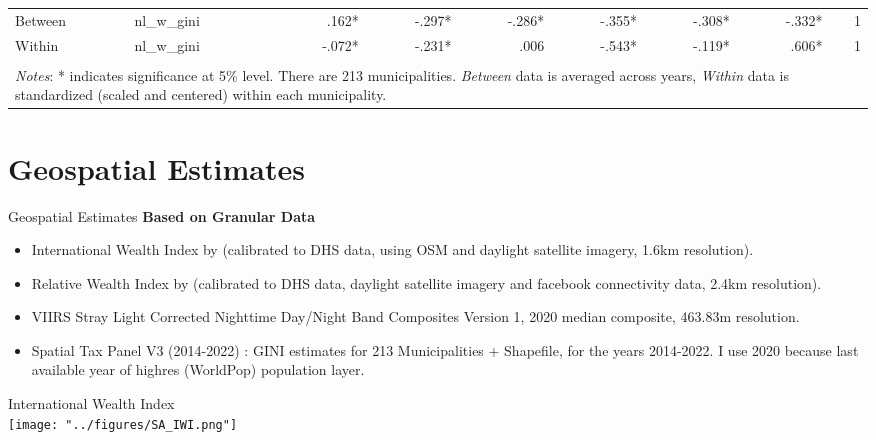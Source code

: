 \documentclass[compress,xcolor=dvipsnames]{beamer}
\newenvironment{noheadline}{
    \setbeamertemplate{headline}{}
    \addtobeamertemplate{frametitle}{\vspace*{-0.9\baselineskip}}{}
}{}
\begin{document}
\begin{frame}
\begin{table}[ht]
{\begin{tabular}{llrrrrrrr}
  Between & nl\_w\_gini &   .162* &  -.297* &  -.286* &  -.355* &  -.308* &  -.332* &    1    \\ 
  Within & nl\_w\_gini &  -.072* &  -.231* &   .006  &  -.543* &  -.119* &   .606* &    1    \\  
   \bottomrule \\ [-1em]
   \multicolumn{9}{l}{\parbox{1.25\textwidth}{\footnotesize \textit{Notes}: * indicates significance at 5\% level. There are 213 municipalities. \textit{Between} data is averaged across years, \textit{Within} data is standardized (scaled and centered) within each municipality.}}
\end{tabular}
}
\end{table}
\end{frame}

\section{Geospatial Estimates}

\begin{noheadline}
\begin{frame}{Geospatial Estimates}
\textbf{Based on Granular Data}
\begin{itemize}
\item International Wealth Index by \citet{lee2022high} (calibrated to DHS data, using OSM and daylight satellite imagery, 1.6km resolution).
\item Relative Wealth Index by \citet{chi2022microestimates} (calibrated to DHS data, daylight satellite imagery and facebook connectivity data, 2.4km resolution).
\item VIIRS Stray Light Corrected Nighttime Day/Night Band Composites Version 1, 2020 median composite, 463.83m resolution.
\item Spatial Tax Panel V3 (2014-2022) \citep{STP3}: GINI estimates for 213 Municipalities + Shapefile, for the years 2014-2022. I use 2020 because last available year of highres (WorldPop) population layer. 
\end{itemize}
\end{frame}
\end{noheadline}


\begin{frame}
International Wealth Index \\ %
\texttt{[image: "../figures/SA\_IWI.png"]}
\end{frame}
\end{document}
